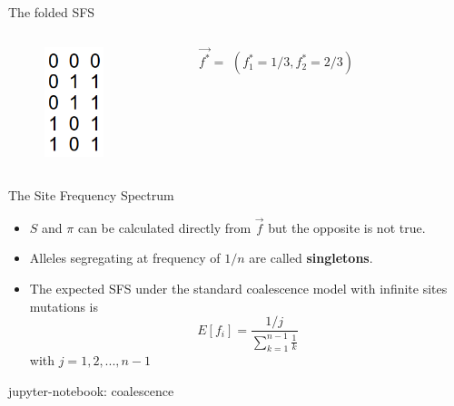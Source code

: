 \begin{frame}{The folded SFS}

        \begin{columns}


                \begin{figure}
                        \includegraphics[width=0.6\textwidth]{Pics/sequences01_only}
                \end{figure}


		$\vec{f^*} = $ \pause $(f^*_1=1/3, f^*_2=2/3)$

        \end{columns}

\end{frame}


\begin{frame}{The Site Frequency Spectrum}

	\begin{itemize}
		\item $S$ and $\pi$ can be calculated directly from $\vec{f}$ but the opposite is not true.
		\item Alleles segregating at frequency of $1/n$ are called \textbf{singletons}.
		\item The expected SFS under the standard coalescence model with infinite sites mutations is
		\begin{equation}
			E[f_i] = \frac{1/j}{\sum_{k=1}^{n-1} \frac{1}{k}}
		\end{equation}
		with $j=1,2,...,n-1$
	\end{itemize}

	\bigskip
	\tiny jupyter-notebook: coalescence

\end{frame}


